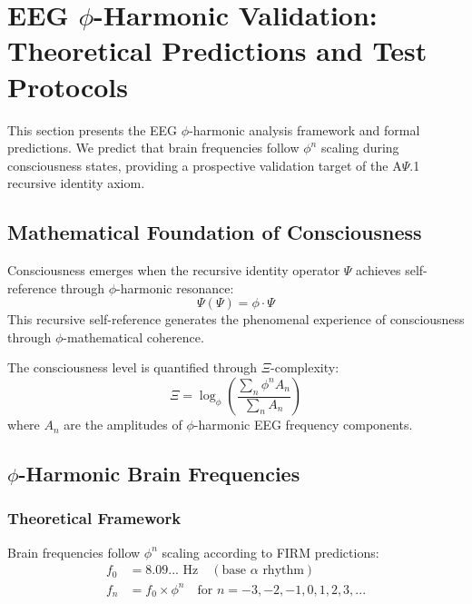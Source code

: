 \section{EEG $\phi$-Harmonic Validation: Theoretical Predictions and Test Protocols}

This section presents the EEG $\phi$-harmonic analysis framework and formal predictions. We predict that brain frequencies follow $\phi^n$ scaling during consciousness states, providing a prospective validation target of the A$\Psi$.1 recursive identity axiom.

\subsection{Mathematical Foundation of Consciousness}

\begin{axiom}
Consciousness emerges when the recursive identity operator $\Psi$ achieves self-reference through $\phi$-harmonic resonance:
\begin{equation}
\Psi(\Psi) = \phi \cdot \Psi
\end{equation}
This recursive self-reference generates the phenomenal experience of consciousness through $\phi$-mathematical coherence.
\end{axiom}

\begin{definition}
The consciousness level is quantified through $\Xi$-complexity:
\begin{equation}
\Xi = \log_\phi\left(\frac{\sum_{n} \phi^n A_n}{\sum_{n} A_n}\right)
\end{equation}
where $A_n$ are the amplitudes of $\phi$-harmonic EEG frequency components.
\end{definition}

\subsection{$\phi$-Harmonic Brain Frequencies}

\subsubsection{Theoretical Framework}

Brain frequencies follow $\phi^n$ scaling according to FIRM predictions:
\begin{align}
 f_0 &= 8.09... \text{ Hz} \quad (\text{base } \alpha \text{ rhythm})\\
 f_n &= f_0 \times \phi^n \quad \text{for } n = -3, -2, -1, 0, 1, 2, 3, ...
\end{align}

